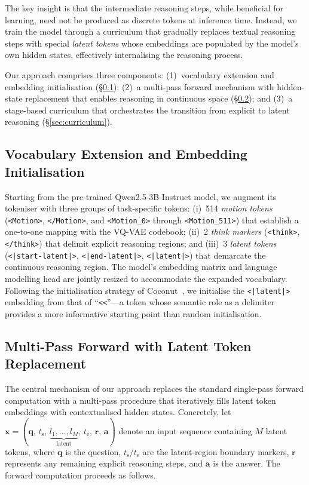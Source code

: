 The key insight is that the intermediate reasoning steps, while beneficial
for learning, need not be produced as discrete tokens at inference time.
Instead, we train the model through a curriculum that gradually replaces
textual reasoning steps with special \emph{latent tokens} whose embeddings
are populated by the model's own hidden states, effectively internalising
the reasoning process.

Our approach comprises three components:
(1)~vocabulary extension and embedding initialisation
    (\S\ref{sec:vocab});
(2)~a multi-pass forward mechanism with hidden-state replacement that
    enables reasoning in continuous space (\S\ref{sec:coconut_forward});
    and
(3)~a stage-based curriculum that orchestrates the transition from
    explicit to latent reasoning (\S\ref{sec:curriculum}).

\subsection{Vocabulary Extension and Embedding Initialisation}
\label{sec:vocab}

Starting from the pre-trained Qwen2.5-3B-Instruct model, we augment its
tokeniser with three groups of task-specific tokens:
(i)~514 \emph{motion tokens} (\texttt{<Motion>}, \texttt{</Motion>}, and
\texttt{<Motion\_0>} through \texttt{<Motion\_511>}) that establish a
one-to-one mapping with the VQ-VAE codebook;
(ii)~2 \emph{think markers} (\texttt{<think>}, \texttt{</think>}) that
delimit explicit reasoning regions; and
(iii)~3 \emph{latent tokens} (\texttt{<|start-latent|>},
\texttt{<|end-latent|>}, \texttt{<|latent|>}) that demarcate the
continuous reasoning region.
The model's embedding matrix and language modelling head are jointly
resized to accommodate the expanded vocabulary.
Following the initialisation strategy of
Coconut~\cite{hao2024training}, we initialise the \texttt{<|latent|>}
embedding from that of ``\texttt{<<}''---a token whose semantic role as a
delimiter provides a more informative starting point than random
initialisation.

\subsection{Multi-Pass Forward with Latent Token Replacement}
\label{sec:coconut_forward}

The central mechanism of our approach replaces the standard single-pass
forward computation with a multi-pass procedure that iteratively fills
latent token embeddings with contextualised hidden states.
Concretely, let
$\mathbf{x}{=}(\mathbf{q},\,t_{\mathrm{s}},\,
  \underbrace{l_1,\ldots,l_M}_{\text{latent}},\,
  t_{\mathrm{e}},\,\mathbf{r},\,\mathbf{a})$
denote an input sequence containing $M$ latent tokens, where $\mathbf{q}$
is the question, $t_{\mathrm{s}}/t_{\mathrm{e}}$ are the latent-region
boundary markers, $\mathbf{r}$ represents any remaining explicit reasoning
steps, and $\mathbf{a}$ is the answer.
The forward computation proceeds as follows.

